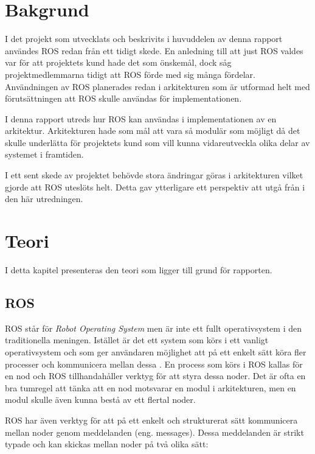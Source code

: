 \section{Bakgrund}
\label{sec:background-lundberg}

I det projekt som utvecklats och beskrivits i huvuddelen av denna rapport användes ROS redan från ett tidigt skede. En anledning till att just ROS valdes var för att projektets kund hade det som önskemål, dock såg projektmedlemmarna tidigt att ROS förde med sig många fördelar. Användningen av ROS planerades redan i arkitekturen som är utformad helt med förutsättningen att ROS skulle användas för implementationen.

I denna rapport utreds hur ROS kan användas i implementationen av en arkitektur. Arkitekturen hade som mål att vara så modulär som möjligt då det skulle underlätta för projektets kund som vill kunna vidareutveckla olika delar av systemet i framtiden.

I ett sent skede av projektet behövde stora ändringar göras i arkitekturen vilket gjorde att ROS uteslöts helt. Detta gav ytterligare ett perspektiv att utgå från i den här utredningen.


\section{Teori}
\label{sec:theory-lundberg}

I detta kapitel presenteras den teori som ligger till grund för rapporten.

\subsection{ROS}
ROS står för \textit{Robot Operating System} men är inte ett fullt operativsystem i den traditionella meningen. Istället är det ett system som körs i ett vanligt operativsystem och som ger användaren möjlighet att på ett enkelt sätt köra fler processer och kommunicera mellan dessa \cite{quigley2009ros}. En process som körs i ROS kallas för en nod och ROS tillhandahåller verktyg för att styra dessa noder. Det är ofta en bra tumregel att tänka att en nod motsvarar en modul i arkitekturen, men en modul skulle även kunna bestå av ett flertal noder.

ROS har även verktyg för att på ett enkelt och strukturerat sätt kommunicera mellan noder genom meddelanden (eng. messages). Dessa meddelanden är strikt typade och kan skickas mellan noder på två olika sätt:

